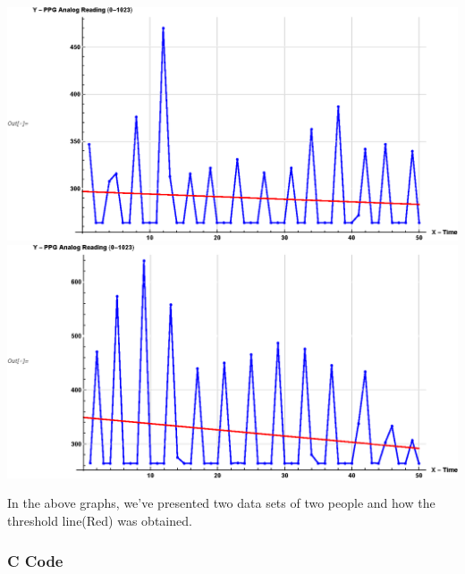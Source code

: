 \documentclass[12pt]{article}
\begin{document}
	\includegraphics[scale=0.8]{simulation1_gr1.eps}\\
	\includegraphics[scale=0.81]{simulation1_gr2.eps}

	In the above graphs, we've presented two data sets of two people and how the threshold line(Red) was obtained.

	\subsubsection{C Code}
\end{document}
